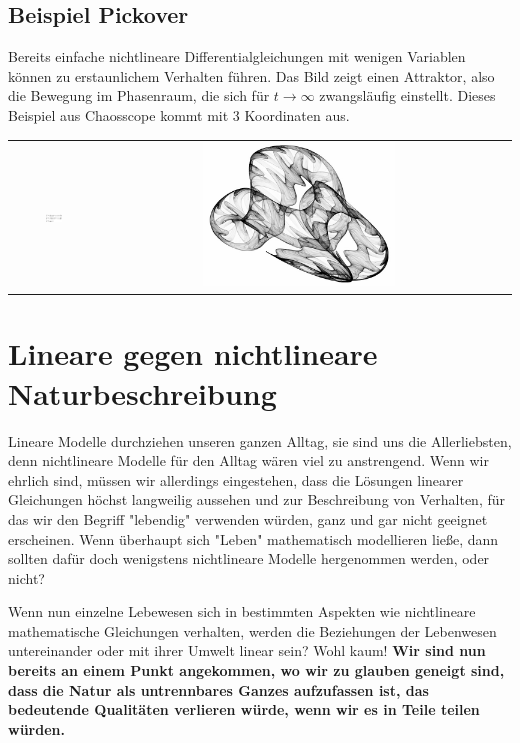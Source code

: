 \documentclass[12pt]{book}
\begin{document}
\subsection{Beispiel Pickover}
Bereits einfache nichtlineare Differentialgleichungen mit wenigen Variablen können zu erstaunlichem Verhalten führen. Das Bild zeigt einen Attraktor, also die Bewegung im Phasenraum, die sich für $t\rightarrow\infty$ zwangsläufig einstellt. Dieses Beispiel aus Chaosscope kommt mit 3 Koordinaten aus.

\begin{center}
\begin{tabular}{c c c}
\includegraphics[width=0.2\textwidth]{Bilder/pickover_equation.png}
&
\includegraphics[width=0.5\textwidth]{Bilder/attractor_pickover.jpg}
\end{tabular}
\end{center}

\section{Lineare gegen nichtlineare Naturbeschreibung}

Lineare Modelle durchziehen unseren ganzen Alltag, sie sind uns die Allerliebsten, denn nichtlineare Modelle für den Alltag wären viel zu anstrengend. Wenn wir ehrlich sind, müssen wir allerdings eingestehen, dass die Lösungen linearer Gleichungen höchst langweilig aussehen und zur Beschreibung von Verhalten, für das wir den Begriff "lebendig" verwenden würden, ganz und gar nicht geeignet erscheinen. Wenn überhaupt sich "Leben" mathematisch modellieren ließe, dann sollten dafür doch wenigstens nichtlineare Modelle hergenommen werden, oder nicht?

Wenn nun einzelne Lebewesen sich in bestimmten Aspekten wie nichtlineare mathematische Gleichungen verhalten, werden die Beziehungen der Lebenwesen untereinander oder mit ihrer Umwelt linear sein? Wohl kaum! \textbf{Wir sind nun bereits an einem Punkt angekommen, wo wir zu glauben geneigt sind, dass die Natur als untrennbares Ganzes aufzufassen ist, das bedeutende Qualitäten verlieren würde, wenn wir es in Teile teilen würden.}
\end{document}
